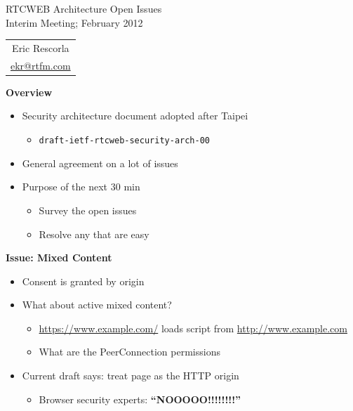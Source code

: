 \documentclass[helvetica]{seminar}
\newcommand{\heading}[1]{%
  \begin{center} 
    \large\bf 
    #1 
  \end{center} 
  \vspace{.4 in}}
\begin{document}
\begin{slide}
\begin{center}
\vspace{1 in}
\LARGE{{\bf}RTCWEB Architecture Open Issues}\\
\vspace{.2in}
\large{{Interim Meeting; February 2012}} \\
\vspace{3em}
\large{
\begin{tabular}{c}
Eric Rescorla \\
\url{ekr@rtfm.com}
\end{tabular}
}
\end{center}

\end{slide}


\centerslidesfalse

\begin{slide}
\heading{Overview}

\begin{itemize}
\item Security architecture document adopted after Taipei
  \begin{itemize}
  \item \verb^draft-ietf-rtcweb-security-arch-00^
  \end{itemize}
\item General agreement on a lot of issues
\item Purpose of the next 30 min
  \begin{itemize}
  \item Survey the open issues
  \item Resolve any that are easy
  \end{itemize}
\end{itemize}
\end{slide}


\begin{slide}
\heading{Issue: Mixed Content}

\begin{itemize}
\item Consent is granted by origin
\item What about active mixed content?
  \begin{itemize}
  \item \url{https://www.example.com/} loads script from \url{http://www.example.com}
  \item What are the PeerConnection permissions
  \end{itemize}

\item Current draft says: treat page as the HTTP origin
  \begin{itemize}
  \item Browser security experts: \textbf{``NOOOOO!!!!!!!!''}
  \end{itemize}

\end{itemize}
\end{slide}
\end{document}
